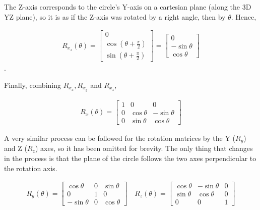 \documentclass[12pt, a4paper]{article}
\begin{document}
The Z-axis corresponds to the circle's Y-axis on a cartesian plane (along the 3D
YZ plane), so it is as if the Z-axis was rotated by a right angle, then by
$\theta$. Hence,

\begin{align*}
    R_{x_z}(\theta)
    = \begin{bmatrix}
          0                            \\
          \cos(\theta + \frac{\pi}{2}) \\
          \sin(\theta + \frac{\pi}{2})
      \end{bmatrix}
    = \begin{bmatrix}
          0           \\
          -\sin\theta \\
          \cos\theta
      \end{bmatrix}
\end{align*}.

Finally, combining $R_{x_x}, R_{x_y}$ and $R_{x_z}$,

\begin{align*}
    R_x(\theta)
    = \begin{bmatrix}
          1 & 0          & 0           \\
          0 & \cos\theta & -\sin\theta \\
          0 & \sin\theta & \cos\theta
      \end{bmatrix}
\end{align*}

A very similar process can be followed for the rotation matrices by the Y
($R_y$) and Z ($R_z$) axes, so it has been omitted for brevity. The only thing
that changes in the process is that the plane of the circle follows the two axes
perpendicular to the rotation axis.

\begin{align*}
    R_y(\theta) = \begin{bmatrix}
                      \cos \theta  & 0 & \sin \theta \\
                      0            & 1 & 0           \\
                      -\sin \theta & 0 & \cos \theta
                  \end{bmatrix}
    \quad
    R_z(\theta) = \begin{bmatrix}
                      \cos \theta & -\sin \theta & 0 \\
                      \sin \theta & \cos \theta  & 0 \\
                      0           & 0            & 1
                  \end{bmatrix}
\end{align*}
\end{document}
